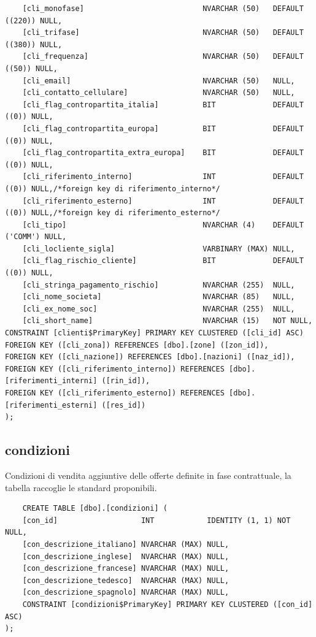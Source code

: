 \documentclass[12pt]{article}
\begin{document}
\begin{lstlisting}
    [cli_monofase]                           NVARCHAR (50)   DEFAULT ((220)) NULL,
    [cli_trifase]                            NVARCHAR (50)   DEFAULT ((380)) NULL,
    [cli_frequenza]                          NVARCHAR (50)   DEFAULT ((50)) NULL,
    [cli_email]                              NVARCHAR (50)   NULL,
    [cli_contatto_cellulare]                 NVARCHAR (50)   NULL,
    [cli_flag_contropartita_italia]          BIT             DEFAULT ((0)) NULL,
    [cli_flag_contropartita_europa]          BIT             DEFAULT ((0)) NULL,
    [cli_flag_contropartita_extra_europa]    BIT             DEFAULT ((0)) NULL,
    [cli_riferimento_interno]                INT             DEFAULT ((0)) NULL,/*foreign key di riferimento_interno*/
    [cli_riferimento_esterno]                INT             DEFAULT ((0)) NULL,/*foreign key di riferimento_esterno*/
    [cli_tipo]                               NVARCHAR (4)    DEFAULT ('COMM') NULL,
    [cli_locliente_sigla]                    VARBINARY (MAX) NULL,
    [cli_flag_rischio_cliente]               BIT             DEFAULT ((0)) NULL,
    [cli_stringa_pagamento_rischio]          NVARCHAR (255)  NULL,
    [cli_nome_societa]                       NVARCHAR (85)   NULL,
    [cli_ex_nome_soc]                        NVARCHAR (255)  NULL,
    [cli_short_name]                         NVARCHAR (15)   NOT NULL, 
CONSTRAINT [clienti$PrimaryKey] PRIMARY KEY CLUSTERED ([cli_id] ASC)
FOREIGN KEY ([cli_zona]) REFERENCES [dbo].[zone] ([zon_id]),
FOREIGN KEY ([cli_nazione]) REFERENCES [dbo].[nazioni] ([naz_id]),
FOREIGN KEY ([cli_riferimento_interno]) REFERENCES [dbo].[riferimenti_interni] ([rin_id]),
FOREIGN KEY ([cli_riferimento_esterno]) REFERENCES [dbo].[riferimenti_esterni] ([res_id])
);
\end{lstlisting}

\subsection{condizioni}
Condizioni di vendita aggiuntive delle offerte definite in fase contrattuale, la tabella raccoglie le standard proponibili.
\begin{lstlisting}
    CREATE TABLE [dbo].[condizioni] (
    [con_id]                   INT            IDENTITY (1, 1) NOT NULL,
    [con_descrizione_italiano] NVARCHAR (MAX) NULL,
    [con_descrizione_inglese]  NVARCHAR (MAX) NULL,
    [con_descrizione_francese] NVARCHAR (MAX) NULL,
    [con_descrizione_tedesco]  NVARCHAR (MAX) NULL,
    [con_descrizione_spagnolo] NVARCHAR (MAX) NULL,
    CONSTRAINT [condizioni$PrimaryKey] PRIMARY KEY CLUSTERED ([con_id] ASC)
);
\end{lstlisting}
\end{document}
